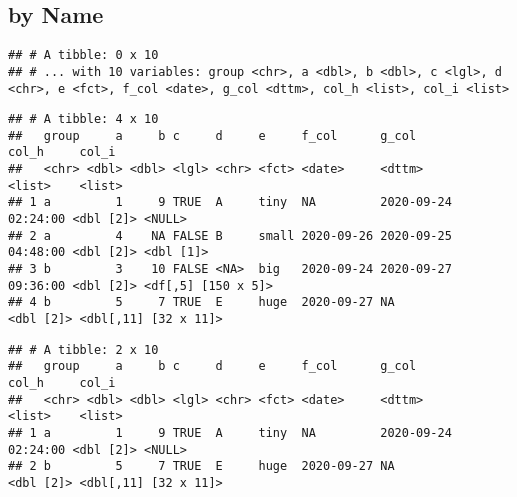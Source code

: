 \documentclass[
]{book}
\newenvironment{Shaded}{\begin{snugshade}}{\end{snugshade}}
\newcommand{\DecValTok}[1]{\textcolor[rgb]{0.00,0.00,0.81}{#1}}
\newcommand{\KeywordTok}[1]{\textcolor[rgb]{0.13,0.29,0.53}{\textbf{#1}}}
\newcommand{\NormalTok}[1]{#1}
\newcommand{\OperatorTok}[1]{\textcolor[rgb]{0.81,0.36,0.00}{\textbf{#1}}}
\newcommand{\StringTok}[1]{\textcolor[rgb]{0.31,0.60,0.02}{#1}}
\begin{document}
\hypertarget{by-name-1}{%
\subsection{by Name}\label{by-name-1}}

\begin{Shaded}
\end{Shaded}

\begin{verbatim}
## # A tibble: 0 x 10
## # ... with 10 variables: group <chr>, a <dbl>, b <dbl>, c <lgl>, d <chr>, e <fct>, f_col <date>, g_col <dttm>, col_h <list>, col_i <list>
\end{verbatim}

\begin{Shaded}
\end{Shaded}

\begin{verbatim}
## # A tibble: 4 x 10
##   group     a     b c     d     e     f_col      g_col               col_h     col_i               
##   <chr> <dbl> <dbl> <lgl> <chr> <fct> <date>     <dttm>              <list>    <list>              
## 1 a         1     9 TRUE  A     tiny  NA         2020-09-24 02:24:00 <dbl [2]> <NULL>              
## 2 a         4    NA FALSE B     small 2020-09-26 2020-09-25 04:48:00 <dbl [2]> <dbl [1]>           
## 3 b         3    10 FALSE <NA>  big   2020-09-24 2020-09-27 09:36:00 <dbl [2]> <df[,5] [150 x 5]>  
## 4 b         5     7 TRUE  E     huge  2020-09-27 NA                  <dbl [2]> <dbl[,11] [32 x 11]>
\end{verbatim}

\begin{Shaded}
\end{Shaded}

\begin{verbatim}
## # A tibble: 2 x 10
##   group     a     b c     d     e     f_col      g_col               col_h     col_i               
##   <chr> <dbl> <dbl> <lgl> <chr> <fct> <date>     <dttm>              <list>    <list>              
## 1 a         1     9 TRUE  A     tiny  NA         2020-09-24 02:24:00 <dbl [2]> <NULL>              
## 2 b         5     7 TRUE  E     huge  2020-09-27 NA                  <dbl [2]> <dbl[,11] [32 x 11]>
\end{verbatim}
\end{document}
